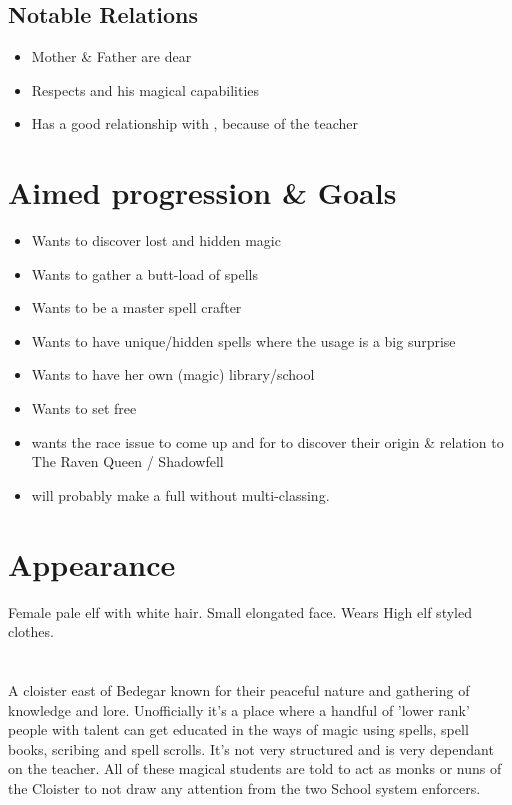     \subsection{Notable Relations}
    \begin{itemize}
        \item Mother \& Father are dear
        \item Respects \Master{} and his magical capabilities
        \item Has a good relationship with \CloisterIntro{}, because of the teacher
    \end{itemize}

    \section{Aimed progression \& Goals}
    \begin{itemize}
        \item Wants to discover lost and hidden magic
        \item Wants to gather a butt-load of spells
        \item Wants to be a master spell crafter
        \item Wants to have unique/hidden spells where the usage is a big surprise
        \item Wants to have her own (magic) library/school
        \item Wants to set \Master{} free
        \item \bookauthor{} wants the race issue to come up and for \Name{} to discover their origin \& relation to The Raven Queen / Shadowfell
        \item \bookauthor{} will probably make \Name{} a full \Class{} without multi-classing.
    \end{itemize}

    \section{Appearance}

    Female pale elf with white hair. Small elongated face. Wears High elf styled clothes.

    \section{\CloisterIntro{}}
    A cloister east of Bedegar known for their peaceful nature and gathering of knowledge and lore. Unofficially it's a place where a handful of 'lower rank' people with talent can get educated in the ways of magic using spells, spell books, scribing and spell scrolls. It's not very structured and is very dependant on the teacher. All of these magical students are told to act as monks or nuns of the Cloister to not draw any attention from the two School system enforcers.

